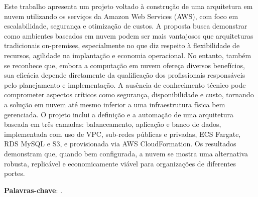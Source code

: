 %
%
%

\setlength{\absparsep}{18pt}
\begin{resumo}

Este trabalho apresenta um projeto voltado à construção de uma arquitetura em nuvem utilizando os serviços da Amazon Web Services (AWS), com foco em escalabilidade, segurança e otimização de custos. A proposta busca demonstrar como ambientes baseados em nuvem podem ser mais vantajosos que arquiteturas tradicionais on-premises, especialmente no que diz respeito à flexibilidade de recursos, agilidade na implantação e economia operacional. No entanto, também se reconhece que, embora a computação em nuvem ofereça diversos benefícios, sua eficácia depende diretamente da qualificação dos profissionais responsáveis pelo planejamento e implementação. A ausência de conhecimento técnico pode comprometer aspectos críticos como segurança, disponibilidade e custo, tornando a solução em nuvem até mesmo inferior a uma infraestrutura física bem gerenciada. O projeto inclui a definição e a automação de uma arquitetura baseada em três camadas: balanceamento, aplicação e banco de dados, implementada com uso de VPC, sub-redes públicas e privadas, ECS Fargate, RDS MySQL e S3, e provisionada via AWS CloudFormation. Os resultados demonstram que, quando bem configurada, a nuvem se mostra uma alternativa robusta, replicável e economicamente viável para organizações de diferentes portes.



\textbf{Palavras-chave}: \imprimirpalavraschave.
\end{resumo}


